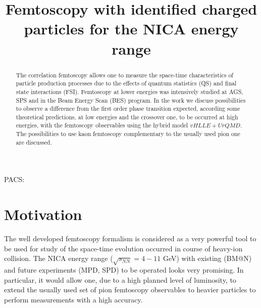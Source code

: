\documentclass[a4paper]{panl}
\begin{document}

\title{Femtoscopy with identified charged particles for the NICA energy range}
\maketitle
{}
\vspace{-3mm}
\vspace{-3mm}
\vspace{-3mm}


\begin{abstract}
  The correlation femtoscopy allows one to measure the space-time characteristics of particle production processes
  due to the effects of quantum statistics (QS) and final state interactions (FSI).
  Femtoscopy at lower energies was intensively studied at AGS, SPS and in the Beam Energy Scan (BES) program.
  In the work we discuss possibilities to observe a difference from the first order phase transition expected, according some theoretical predictions,
  at low energies and the crossover one, to be occurred at high energies, with the femtoscopy observables using the hybrid model $vHLLE+UrQMD$.
  The possibilities to use kaon femtoscopy complementary to the usually used pion one are discussed.
\end{abstract}
\vspace*{6pt}

\noindent
PACS:

\vspace{-6mm}
\label{sec:intro}
\section*{Motivation}

The well developed femtoscopy formalism is considered as a very powerful tool to be used for study of the space-time evolution occurred in course of heavy-ion collision.
The NICA energy range ($\sqrt{s_{NN}} = 4 - 11$ GeV) with existing (BM@N) and future experiments (MPD, SPD) to be operated looks very promising.
In particular, it would allow one, due to a high planned level of luminosity, to extend the usually used set of pion femtoscopy observables to heavier particles to perform
  measurements with a high accuracy.     
\end{document}
